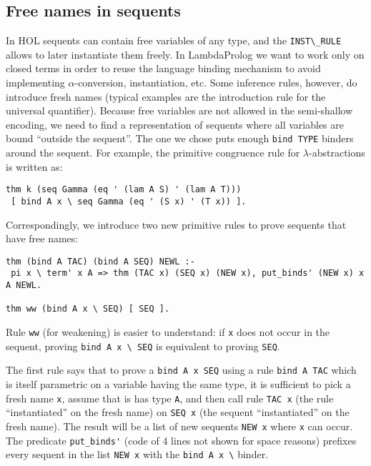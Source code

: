 \documentclass[preprint]{sigplanconf}
\begin{document}
\subsection{Free names in sequents}
In HOL sequents can contain free variables of any type, and the \verb+INST\_RULE+ allows to later instantiate them freely. In LambdaProlog we want to work only on closed terms in order to reuse the language binding mechanism to avoid implementing $\alpha$-conversion, instantiation, etc. Some inference rules, however, do introduce fresh names (typical examples are the introduction rule for the universal quantifier). Because free variables are not allowed in the semi-shallow encoding, we need to find a representation of sequents where all variables are bound ``outside the sequent''. The one we chose puts enough \verb+bind TYPE+ binders around the sequent. For example, the primitive congruence rule for $\lambda$-abstractions is written as:

\begin{small}
\begin{verbatim}
thm k (seq Gamma (eq ' (lam A S) ' (lam A T)))
 [ bind A x \ seq Gamma (eq ' (S x) ' (T x)) ].
\end{verbatim}
\end{small}

Correspondingly, we introduce two new primitive rules to prove sequents
that have free names:

\begin{small}
\begin{verbatim}
thm (bind A TAC) (bind A SEQ) NEWL :-
 pi x \ term' x A => thm (TAC x) (SEQ x) (NEW x), put_binds' (NEW x) x A NEWL.

thm ww (bind A x \ SEQ) [ SEQ ].
\end{verbatim}
\end{small}

Rule \verb+ww+ (for weakening) is easier to understand: if \verb+x+ does not occur in the sequent, proving \verb+bind A x \ SEQ+ is equivalent to proving \verb+SEQ+.

The first rule says that to prove a \verb+bind A x SEQ+ using a rule \verb+bind A TAC+ which is itself parametric on a variable having the same type, it is sufficient to pick a fresh name \verb+x+, assume that is has type \verb+A+, and then call rule \verb+TAC x+ (the rule ``instantiated'' on the fresh name) on \verb+SEQ x+ (the sequent ``instantiated'' on the fresh name). The result will be a list of new sequents \verb+NEW x+ where \verb+x+ can occur. The predicate \verb+put_binds'+ (code of 4 lines not shown for space reasons) prefixes every sequent in the list \verb+NEW x+ with the \verb+bind A x \+ binder.
\end{document}
